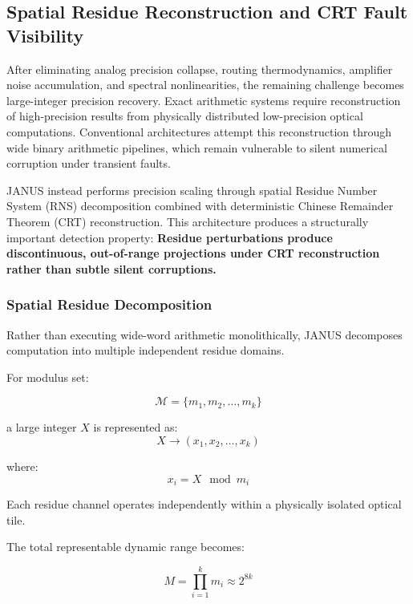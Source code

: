 \documentclass[journal]{IEEEtran}
\begin{document}
\subsection{\textbf{Spatial Residue Reconstruction and CRT Fault Visibility}}

After eliminating analog precision collapse, routing thermodynamics, amplifier noise accumulation, and spectral nonlinearities, the remaining challenge becomes large-integer precision recovery. Exact arithmetic systems require reconstruction of high-precision results from physically distributed low-precision optical computations. Conventional architectures attempt this reconstruction through wide binary arithmetic pipelines, which remain vulnerable to silent numerical corruption under transient faults.

JANUS instead performs precision scaling through spatial Residue Number System (RNS) decomposition combined with deterministic Chinese Remainder Theorem (CRT) reconstruction. This architecture produces a structurally important detection property:
\textbf{Residue perturbations produce discontinuous, out-of-range projections under CRT reconstruction rather than subtle silent corruptions.}

\subsubsection{\textbf{Spatial Residue Decomposition}}

Rather than executing wide-word arithmetic monolithically, JANUS decomposes computation into multiple independent residue domains.

For modulus set:

\begin{equation}
\mathcal{M} = \{m_1, m_2, \dots, m_k\}
\end{equation}

a large integer $X$ is represented as:
\begin{equation}
X \rightarrow (x_1, x_2, \dots, x_k)
\end{equation}

where:
\begin{equation}
x_i = X \mod m_i
\end{equation}

Each residue channel operates independently within a physically isolated optical tile.

The total representable dynamic range becomes:

\begin{equation}
M = \prod_{i=1}^k m_i \approx 2^{8k}
\end{equation}
\end{document}
